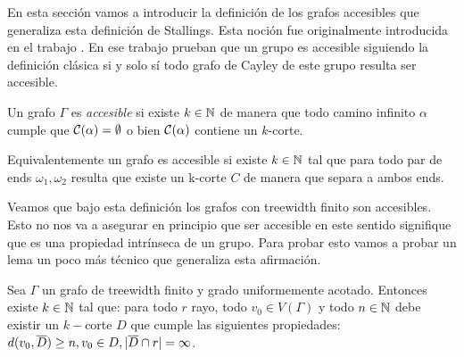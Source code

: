 \documentclass[tesis.tex]{subfiles}
\begin{document}
En esta sección vamos a introducir la definición de los grafos accesibles que generaliza esta definición de Stallings.
Esta noción fue originalmente introducida en el trabajo \cite{thomassen1993vertex}.
En ese trabajo prueban que un grupo es accesible siguiendo la definición clásica si y solo sí todo grafo de Cayley de este grupo resulta ser accesible.
\begin{deff}
	Un grafo $\Gamma$ es \emph{accesible} si existe $k \in \mathbb{N}$ de manera que todo camino infinito $\alpha$ cumple que ${\cal C}(\alpha) = \emptyset$ o bien ${\cal C}(\alpha)$ contiene un $k$-corte.
\end{deff}
Equivalentemente un grafo es accesible si existe $k \in \mathbb{N}$ tal que para todo par de ends $\omega_1, \omega_2$ resulta que existe un k-corte $C$ de manera que separa a ambos ends.

Veamos que bajo esta definición los grafos con treewidth finito son accesibles.
Esto no nos va a asegurar en principio que ser accesible en este sentido signifique que es una propiedad intrínseca de un grupo.
Para probar esto vamos a probar un lema un poco más técnico que generaliza esta afirmación.

\begin{lema}\label{lema_corte_treewidth}
	Sea $\Gamma$ un grafo de treewidth finito y grado uniformemente acotado.
	Entonces existe $k \in \mathbb{N}$ tal que:
	para todo $r$ rayo, todo $v_0 \in V(\Gamma)$ y todo $n \in \mathbb{N}$ debe existir un $k-$corte $D$ que cumple las siguientes propiedades: $d(v_0,\overline D) \ge n, v_0 \in D, |\overline D \cap r| = \infty$. 
\end{lema}
\end{document}
